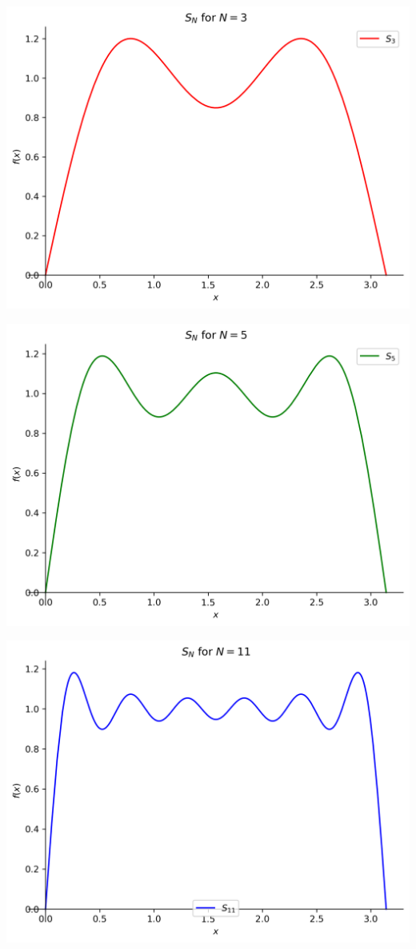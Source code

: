 \documentclass{exam}
\begin{document}
\begin{questions}
\begin{parts}
\begin{solution}
    \centering
    \includegraphics[scale=0.67]{5bs3.png}

    \centering
    \includegraphics[scale=0.67]{5bs5.png}

    \centering
    \includegraphics[scale=0.67]{5bs11.png}
    

\end{solution}
\end{parts}
\end{questions}
\end{document}
